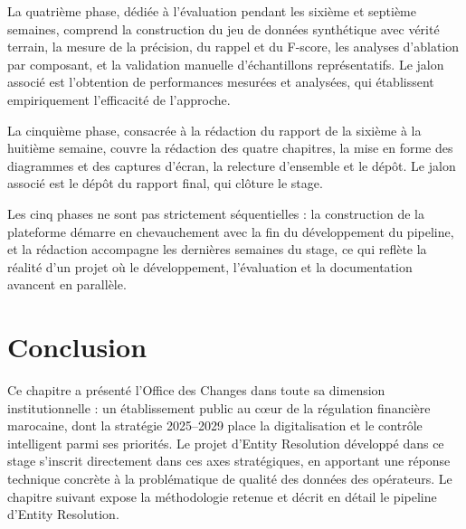 La quatrième phase, dédiée à l'évaluation pendant les sixième et septième semaines, comprend la construction du jeu de données synthétique avec vérité terrain, la mesure de la précision, du rappel et du F-score, les analyses d'ablation par composant, et la validation manuelle d'échantillons représentatifs. Le jalon associé est l'obtention de performances mesurées et analysées, qui établissent empiriquement l'efficacité de l'approche.

La cinquième phase, consacrée à la rédaction du rapport de la sixième à la huitième semaine, couvre la rédaction des quatre chapitres, la mise en forme des diagrammes et des captures d'écran, la relecture d'ensemble et le dépôt. Le jalon associé est le dépôt du rapport final, qui clôture le stage.

\noindent Les cinq phases ne sont pas strictement séquentielles : la construction de la plateforme démarre en chevauchement avec la fin du développement du pipeline, et la rédaction accompagne les dernières semaines du stage, ce qui reflète la réalité d'un projet où le développement, l'évaluation et la documentation avancent en parallèle.

\section*{Conclusion}

Ce chapitre a présenté l'Office des Changes dans toute sa dimension institutionnelle : un établissement public au cœur de la régulation financière marocaine, dont la stratégie 2025--2029 place la digitalisation et le contrôle intelligent parmi ses priorités. Le projet d'Entity Resolution développé dans ce stage s'inscrit directement dans ces axes stratégiques, en apportant une réponse technique concrète à la problématique de qualité des données des opérateurs. Le chapitre suivant expose la méthodologie retenue et décrit en détail le pipeline d'Entity Resolution.
